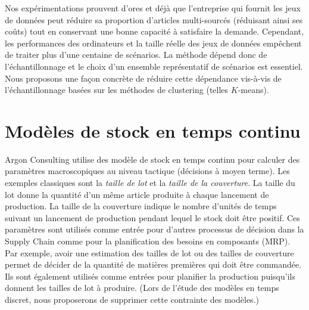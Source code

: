 \medskip


Nos expérimentations prouvent d'ores et déjà que l'entreprise qui fournit les jeux de données peut réduire sa proportion d'articles multi-sourcés (réduisant ainsi ses coûts) tout en conservant une bonne capacité à satisfaire la demande.
Cependant, les performances des ordinateurs et la taille réelle des jeux de données empêchent de traiter plus d'une centaine de scénarios.
La méthode dépend donc de l'échantillonnage et le choix d'un ensemble représentatif de scénarios est essentiel.
Nous proposons une façon concrète de réduire cette dépendance vis-à-vis de l'échantillonnage basées sur les méthodes de clustering (telles $K$-means).


\section{Modèles de stock en temps continu}
\label{sec:intro:fr:continuous-time-inventory-models}


Argon Consulting utilise des modèle de stock en temps continu pour calculer des paramètres macroscopiques au niveau tactique (décisions à moyen terme).
Les exemples classiques sont la \emph{taille de lot} et la \emph{taille de la couverture}.
La taille du lot donne la quantité d'un même article produite à chaque lancement de production.
La taille de la couverture indique le nombre d'unités de temps suivant un lancement de production pendant lequel le stock doit être positif.
Ces paramètres sont utilisés comme entrée pour d'autres processus de décision dans la Supply Chain comme pour la planification des besoins en composants (MRP).
Par exemple, avoir une estimation des tailles de lot ou des tailles de couverture permet de décider de la quantité de matières premières qui doit être commandée.
Ils sont également utilisés comme entrées pour planifier la production puisqu'ils donnent les tailles de lot à produire.
(Lors de l'étude des modèles en temps discret, nous proposerons de supprimer cette contrainte des modèles.)


